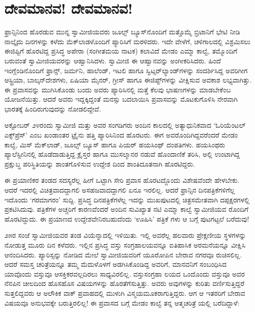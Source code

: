 
\chapter{ದೇವಮಾನವ! ದೇವಮಾನವ!}

\noindent

ಫ್ರಾನ್ಸಿನಿಂದ ಹೊರಡುವ ಮುನ್ನ ಸ್ವಾಮೀಜಿಯವರು ಜೂಲ್ಸ್ ಬ್ಯೂಸ್​ನೊಂದಿಗೆ ಮತ್ತೊಮ್ಮೆ ಬ್ರಿಟಾನಿಗೆ ಭೇಟಿ ನೀಡಿ ನಾಲ್ಕೈದು ದಿನಗಳನ್ನು ಕಳೆದು ಮೆಕ್​ಲಾಡಳೊಂದಿಗೆ ಪ್ಯಾರಿಸಿಗೆ ಮರಳಿದರು. ಇದೇ ವೇಳೆಗೆ, ಚಳಿಗಾಲದಲ್ಲಿ ವಿಶ್ರಮಿಸಲು ಈಜಿಪ್ಟಿಗೆ ಹೊರಟಿದ್ದ ಪ್ರಸಿದ್ಧ ಅಪೇರಾ (ಸಂಗೀತಮಯ ನಾಟಕ) ಕಲಾವಿದೆ ಮೇಡಂ ಎಮ್ಮಾ ಕಾಲ್ವೆ, ತಮ್ಮೊಂದಿಗೆ ಬರುವಂತೆ ಸ್ವಾಮೀಜಿಯವರನ್ನು ಆಹ್ವಾನಿಸಿದಳು. ಸ್ವಾಮೀಜಿ ಈ ಆಹ್ವಾನವನ್ನು ಅಂಗೀಕರಿಸಿದರು. ಹಿಂದೆ ಇಂಗ್ಲೆಂಡಿನೊಂದಿಗೆ ಫ್ರಾನ್ಸ್, ಜರ್ಮನಿ, ಹಾಲೆಂಡ್, ಇಟಲಿ ಹಾಗೂ ಸ್ವಿಟ್ಸರ್​ಲ್ಯಾಂಡ್​ಗಳನ್ನು ಸಂದರ್ಶಿಸಿದ್ದ ಅವರಿಗೀಗ ಆಸ್ಟ್ರಿಯಾ, ಬಾಲ್ಕನ್​ದೇಶಗಳು, ಏಷಿಯಾ ಮೈನರ್, ಗ್ರೀಸ್ ಹಾಗೂ ಈಜಿಪ್ಟ್​ಗಳನ್ನು ವೀಕ್ಷಿಸುವ ಅವಕಾಶ ಲಭ್ಯವಾಗಿತ್ತು. ಈ ಪ್ರವಾಸವನ್ನು ಮುಗಿಸಿಕೊಂಡು ಬಂದು ಅವರು ಪ್ಯಾರಿಸಿನಲ್ಲಿ ಮತ್ತೆ ಕೆಲವು ಭಾಷಣಗಳನ್ನು ಮಾಡಬೇಕೆಂಬ ಯೋಜನೆಯಿತ್ತು. ಆದರೆ ಅವರು ಇದ್ದಕ್ಕಿದ್ದಂತೆ ಮನಸ್ಸು ಬದಲಾಯಿಸಿ ಪ್ರವಾಸವನ್ನು ಮೊಟಕುಗೊಳಿಸಿ ನೇರವಾಗಿ ಭಾರತಕ್ಕೆ ಹಿಂದಿರುಗುವುದನ್ನು ನೋಡಲಿದ್ದೇವೆ.

ಅಕ್ಟೋಬರ್ ೨೪ರಂದು ಸ್ವಾಮೀಜಿ ಮತ್ತು ಅವರ ಸಂಗಡಿಗರು ಅಂದಿನ ಕಾಲದಲ್ಲಿ ಅತ್ಯಾಧುನಿಕವಾದ ‘ಓರಿಯೆಂಟಲ್ ಎಕ್ಸ್​ಪ್ರೆಸ್​’ ಎಂಬ ಖಂಡಾಂತರ  ಟ್ರೈನು ಹತ್ತಿ ಪ್ಯಾರಿಸಿನಿಂದ ಹೊರಟರು. ಈಗ ಅವರೊಂದಿಗಿದ್ದವರೆಂದರೆ ಮೇಡಂ ಕಾಲ್ವೆ, ಮಿಸ್ ಮೆಕ್​ಲಾಡ್, ಜೂಲ್ಸ್ ಬ್ಯೂಸ್ ಹಾಗೂ ಪಿಯರ್ ಹಯಸಿಂಥ್ ದಂಪತಿಗಳು. ಹಯಸಿಂಥರು ಪ್ಯಾಲೆಸ್ಟೀನಿನಲ್ಲಿ ಹೊಡೆದಾಡುತ್ತಿದ್ದ ಕ್ರೈಸ್ತರ ಹಾಗೂ ಮುಸಲ್ಮಾನರ ನಡುವೆ ಹೊಂದಾಣಿಕೆ ತರಿಸಿ, ಅಲ್ಲಿ ಉಂಟಾಗಿದ್ದ ಪ್ರಕ್ಷುಬ್ಧ ಪರಿಸ್ಥಿತಿಯನ್ನು ಶಾಂತಗೊಳಿಸುವ ಉದ್ದೇಶ ದಿಂದ ಶಾಂತಿದೂತನಾಗಿ ಹೊರಟಿದ್ದರು.

ಈ ಪ್ರಯಾಣಿಕರ ತಂಡದ ಸದಸ್ಯರೆಲ್ಲ ಹೀಗೆ ಒಟ್ಟಾಗಿ ಸೇರಿ ಪ್ರವಾಸ ಹೊರಟದ್ದೊಂದು ವಿಶೇಷವೆಂದೇ ಹೇಳಬೇಕು. ಆದರೆ ಇದರಲ್ಲಿ ವಿಚಿತ್ರವಾದದ್ದಾಗಲಿ ಅಸಹಜವಾದದ್ದಾಗಲಿ ಏನೂ ಇರಲಿಲ್ಲ. ಆದರೆ ಫ್ರಾನ್ಸಿನ ದಿನಪತ್ರಿಕೆಗಳಿಗೆಲ್ಲ ಇದೊಂದು ‘ಗರಮಾಗರಂ’ ಸುದ್ದಿ. ಪ್ರಸಿದ್ಧ ದಿನಪತ್ರಿಕೆಗಳೆಲ್ಲ ಇದನ್ನು ಮುಖಪುಟದಲ್ಲಿ ಚಿತ್ರಸಮೇತವಾಗಿ ದಪ್ಪಕ್ಷರಗಳಲ್ಲಿ ಪ್ರಕಟಿಸಿದುವು. ಪತ್ರಿಕೆಗಳ ಅಚ್ಚರಿಗೆ ಕಾರಣವೆಂದರೆ ಅಂದಿನ ಸುವಿಖ್ಯಾತ ನಟಿ ಎಮ್ಮಾ ಕಾಲ್ವೆ ಸ್ವಾಮೀಜಿಯವ ರೊಂದಿಗೆ ಹೊರಟಿದ್ದುದು. ಈ ಪ್ರಯಾಣದ ಉದ್ದೇಶವೇನಿರಬಹುದೆಂದು ‘ಊಹಿಸಿ’ ಪತ್ರಿಕೆ ಗಳು ಆ ಬಗ್ಗೆ ಪುಟಗಟ್ಟಲೆ ಬರೆದುವು!

೨೫ರ ಸಂಜೆ ಸ್ವಾಮೀಜಿಯವರ ತಂಡ ವಿಯೆನ್ನಾದಲ್ಲಿ ಇಳಿಯಿತು. ಇಲ್ಲಿ ಅವರೆಲ್ಲ ಹಲವಾರು ಪ್ರೇಕ್ಷಣೀಯ ಸ್ಥಳಗಳನ್ನು ನೋಡುತ್ತ ಮೂರು ದಿನ ಕಳೆದರು. ಇಲ್ಲಿನ ಪ್ರಸಿದ್ಧ ವಸ್ತು ಸಂಗ್ರಹಾಲಯವನ್ನೂ ಐತಿಹಾಸಿಕ ಅರಮನೆಯನ್ನೂ ವೀಕ್ಷಿಸಿ ಆನಂದಿಸಿದರು. ಪ್ಯಾರಿಸ್ಸನ್ನು ನೋಡಿದ ಮೇಲೆ ಸ್ವಾಮೀಜಿಯವರಿಗೆ ಯೂರೋಪಿನ ಬೇರಾವ ನಗರವೂ ರುಚಿಸಲಿಲ್ಲ. ಆದರೆ ಸಮಸ್ತ ಚರಿತ್ರೆಯನ್ನೂ ತಮ್ಮ ಮೆದುಳೊಳಗೆ ಅಡಗಿಸಿಕೊಂಡಿದ್ದ ಅವರಿಗೆ, ಮಾನವನಿಗೆ ಸಂಬಂಧಿಸಿದ ಯಾವೊಂದು ವಸ್ತುವೂ ಆಸಕ್ತಿಕರವಲ್ಲದಿರಲು ಸಾಧ್ಯವಿರಲಿಲ್ಲ. ವಸ್ತುಸಂಗ್ರಹಾ ಲಯದ ಒಂದೊಂದು ವಸ್ತುವೂ ಅವರ ನೆನಪಿನ ಚೀಲದಿಂದ ಹೊಸಹೊಸ ವಿಷಯಗಳನ್ನು ಹೊರತೆಗೆಸುತ್ತಿತ್ತು. ಅವರು ಅವುಗಳನ್ನು ಕುರಿತು ವರ್ಣಿಸುತ್ತಿದ್ದರೆ ಸುತ್ತಲಿದ್ದವರು ಆ ಅಲೌಕಿಕ ವಾಕ್ ಪ್ರವಾಹದಲ್ಲಿ ಮುಳುಗಿ ವಿಸ್ಮಯಮೂಕರಾಗುತ್ತಿದ್ದರು. ಆಗ ಆ ಇತರರಿಗೆ ಬೇರಾವ ವಿಷಯವೂ ಅನುಭವಕ್ಕೇ ಬರುತ್ತಿರಲಿಲ್ಲ! ಈ ಪ್ರವಾಸದ ಬಗ್ಗೆ ಮೇಡಂ ಕಾಲ್ವೆ ತನ್ನ ಆತ್ಮಚರಿತ್ರೆ ಯಲ್ಲಿ ಬರೆದಿದ್ದಾಳೆ:

